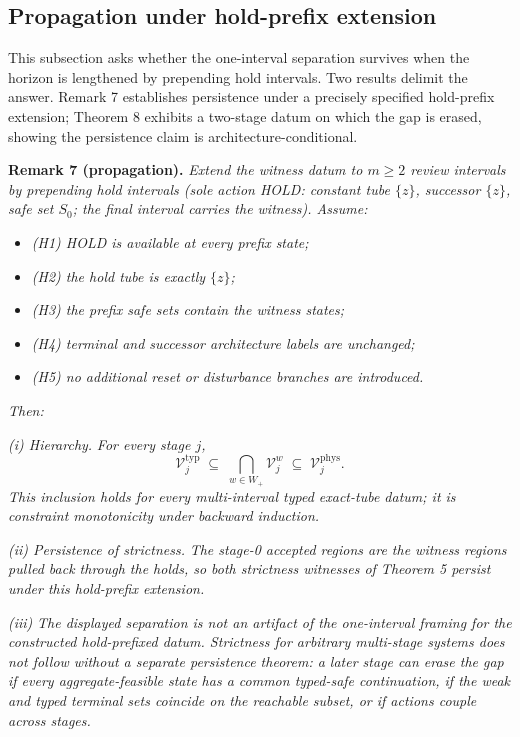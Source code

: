 \documentclass[3p,11pt]{elsarticle}
\providecommand{\tightlist}{\setlength{\itemsep}{0pt}\setlength{\parskip}{0pt}}
\begin{document}
\subsection{Propagation under hold-prefix
extension}\label{propagation-under-hold-prefix-extension}

This subsection asks whether the one-interval separation survives when
the horizon is lengthened by prepending hold intervals. Two results
delimit the answer. Remark 7 establishes persistence under a precisely
specified hold-prefix extension; Theorem 8 exhibits a two-stage datum on
which the gap is erased, showing the persistence claim is
architecture-conditional.

\textbf{Remark 7 (propagation).} \emph{Extend the witness datum to
\(m \ge 2\) review intervals by prepending hold intervals (sole action
HOLD: constant tube \(\{z\}\), successor \(\{z\}\), safe set \(S_0\);
the final interval carries the witness). Assume:}

\begin{itemize}
\tightlist
\item
  \emph{(H1) HOLD is available at every prefix state;}
\item
  \emph{(H2) the hold tube is exactly \(\{z\}\);}
\item
  \emph{(H3) the prefix safe sets contain the witness states;}
\item
  \emph{(H4) terminal and successor architecture labels are unchanged;}
\item
  \emph{(H5) no additional reset or disturbance branches are
  introduced.}
\end{itemize}

\emph{Then:}

\emph{(i) Hierarchy.} \emph{For every stage \(j\),}
\[\mathcal{V}^{\mathrm{typ}}_j \;\subseteq\; \bigcap_{w \in W_+} \mathcal{V}^{w}_j \;\subseteq\; \mathcal{V}^{\mathrm{phys}}_j.\]
\emph{This inclusion holds for every multi-interval typed exact-tube
datum; it is constraint monotonicity under backward induction.}

\emph{(ii) Persistence of strictness.} \emph{The stage-0 accepted
regions are the witness regions pulled back through the holds, so both
strictness witnesses of Theorem 5 persist under this hold-prefix
extension.}

\emph{(iii)} \emph{The displayed separation is not an artifact of the
one-interval framing for the constructed hold-prefixed datum. Strictness
for arbitrary multi-stage systems does not follow without a separate
persistence theorem: a later stage can erase the gap if every
aggregate-feasible state has a common typed-safe continuation, if the
weak and typed terminal sets coincide on the reachable subset, or if
actions couple across stages.}
\end{document}
